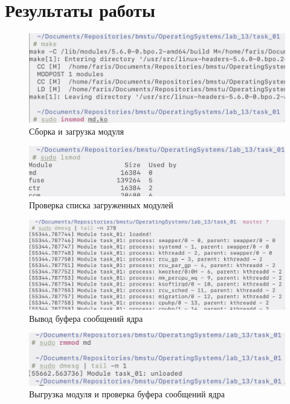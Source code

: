 \section{Результаты работы}

\begin{figure}[H]
    \centering
    \caption{Сборка и загрузка модуля}
    \includegraphics[scale=0.45]{images/src_01.png}
\end{figure}
\begin{figure}[H]
    \centering
    \caption{Проверка списка загруженных модулей}
    \includegraphics[scale=0.45]{images/src_02.png}
\end{figure}
\begin{figure}[H]
    \centering
    \caption{Вывод буфера сообщений ядра}
    \includegraphics[scale=0.4]{images/src_03.png}
\end{figure}
\begin{figure}[H]
    \centering
    \caption{Выгрузка модуля и проверка буфера сообщений ядра}
    \includegraphics[scale=0.45]{images/src_04.png}
\end{figure}
